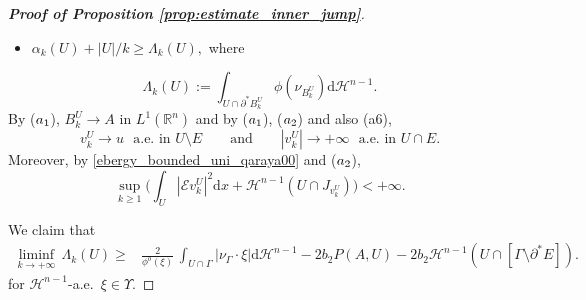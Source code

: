 \documentclass[reqno]{amsart}
\numberwithin{equation}{section}
\theoremstyle{plain}
\theoremstyle{definition}
\newcommand{\R}{\mathbb{R}}
\newcommand{\cH}{\mathcal{H}}
\newcommand{\p}{\partial}
\newcommand{\bound}{b}
\renewcommand{\d}{\mathrm{d}}
\newcommand{\str}[1]{\mathcal{E}#1}
\begin{document}
\begin{proof}[\textbf{Proof of Proposition \ref{prop:estimate_inner_jump}}]
\begin{itemize}
 \item[($a_4$)]  $\alpha_k(U) + |U|/k \ge \Lambda_k(U),$ where 
\end{itemize}
$$
\Lambda_k(U):= \int_{U\cap\p^*B_k^U} \phi(\nu_{B_k^U})\d\cH^{n-1}. 
$$
By ($\rm a_1$), $B_k^U\to A$ in $L^1(\R^n)$  and by ($\rm a_1$), ($\rm a_2$) and also (a6),
%
\begin{equation}\label{bad_conver_vk_U}
v_k^U\to u\,\,\,\,\text{a.e.\  in $U\setminus E$}\qquad\text{and}\qquad |v_k^U|\to+\infty\,\,\,\, \text{a.e.\  in $U\cap E.$}  
\end{equation}
Moreover, by \eqref{ebergy_bounded_uni_qaraya00} and ($\rm a_2$),
$$
\sup_{k\ge1} \Big(\int_U|\str{v_k^U}|^2\d x + \cH^{n-1}(U\cap J_{v_k^U})\Big) <+\infty.
$$

We claim that 
\begin{align}\label{eq:Step1}
\liminf\limits_{k\to+\infty}  \, \Lambda_k(U) \ge  & \frac{2}{\phi^o(\xi) }\,
\int_{U\cap \Gamma}|\nu_\Gamma\cdot\xi| \d\cH^{n-1} 
 -
 2\bound_2P(A,U) - 2\bound_2\cH^{n-1}(U \cap [\Gamma\setminus \p^*E]).
\end{align}
for $\cH^{n-1}$-a.e.\  $\xi\in \Upsilon.$


\end{proof}
\end{document}
